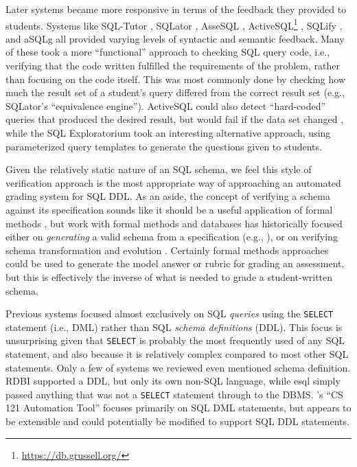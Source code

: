 \documentclass[sigconf, authordraft, capitalise]{acmart}
\begin{document}
Later systems became more responsive in terms of the feedback they provided to students. Systems like SQL-Tutor \cite{Mitrovic.A-1998a-Learning}, SQLator \cite{Sadiq.S-2004a-SQLator}, AsseSQL \cite{Prior.J-2004a-Backwash}, ActiveSQL\footnote{\url{https://db.grussell.org/}} \cite{Russell.G-2004a-Improving,Russell.G-2005a-Online}, SQLify \cite{Dekeyser.S-2007a-Computer}, and aSQLg \cite{Kleiner.C-2013a-Automated} all provided varying levels of syntactic and semantic feedback. Many of these took a more ``functional'' approach to checking SQL query code, i.e., verifying that the code written fulfilled the requirements of the problem, rather than focusing on the code itself. This was most commonly done by checking how much the result set of a student's query differed from the correct result set (e.g., SQLator's ``equivalence engine''). ActiveSQL could also detect ``hard-coded'' queries that produced the desired result, but would fail if the data set changed \cite{Russell.G-2005a-Online}, while the SQL Exploratorium \cite{Brusilovsky.P-2010a-Learning} took an interesting alternative approach, using parameterized query templates to generate the questions given to students.

Given the relatively static nature of an SQL schema, we feel this style of verification approach is the most appropriate way of approaching an automated grading system for SQL DDL. As an aside, the concept of verifying a schema against its specification sounds like it should be a useful application of formal methods \cite{Spivey.J-1989a-An-introduction}, but work with formal methods and databases has historically focused either on \emph{generating} a valid schema from a specification (e.g., \cite{Vatanawood.W-2004a-Formal,Lukovic.I-2003a-Proceedings,Choppella.V-2006a-Constructing}), or on verifying schema transformation and evolution \cite{Bench-Capon.T-1998a-Report}. Certainly formal methods approaches could be used to generate the model answer or rubric for grading an assessment, but this is effectively the inverse of what is needed to grade a student-written schema.

Previous systems focused almost exclusively on SQL \emph{queries} using the \texttt{SELECT} statement (i.e., DML) rather than SQL \emph{schema definitions} (DDL). This focus is unsurprising given that \texttt{SELECT} is probably the most frequently used of any SQL statement, and also because it is relatively complex compared to most other SQL statements. Only a few of systems we reviewed even mentioned schema definition. RDBI \cite{Dietrich.S-1993a-An-educational} supported a DDL, but only its own non-SQL language, while esql \cite{Kearns.R-1997a-A-teaching} simply passed anything that was not a \texttt{SELECT} statement through to the DBMS. \citeauthor{Gong.A-2015a-CS-121-Automation}'s ``CS 121 Automation Tool'' \cite{Gong.A-2015a-CS-121-Automation} focuses primarily on SQL DML statements, but appears to be extensible and could potentially be modified to support SQL DDL statements.
\end{document}
